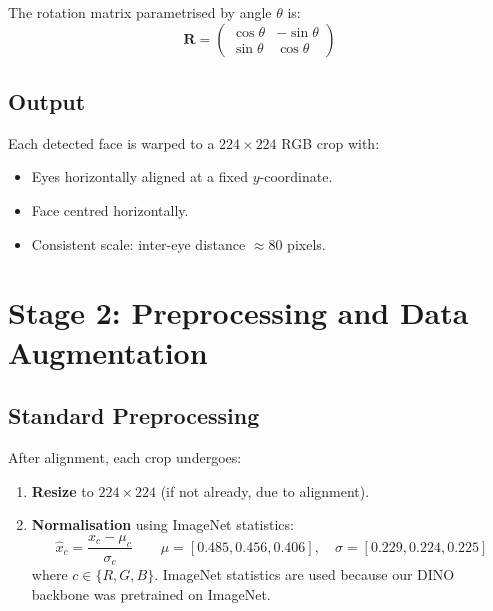 \documentclass[12pt,a4paper]{article}
\begin{document}
The rotation matrix parametrised by angle $\theta$ is:
\begin{equation}
  \mathbf{R} = \begin{pmatrix} \cos\theta & -\sin\theta \\ \sin\theta & \cos\theta \end{pmatrix}
\end{equation}

\subsection{Output}

Each detected face is warped to a $224 \times 224$ RGB crop with:
\begin{itemize}[leftmargin=1.5em]
  \item Eyes horizontally aligned at a fixed $y$-coordinate.
  \item Face centred horizontally.
  \item Consistent scale: inter-eye distance $\approx 80$ pixels.
\end{itemize}

\newpage

\section{Stage 2: Preprocessing and Data Augmentation}

\subsection{Standard Preprocessing}

After alignment, each crop undergoes:

\begin{enumerate}[leftmargin=1.5em]
  \item \textbf{Resize} to $224 \times 224$ (if not already, due to alignment).
  \item \textbf{Normalisation} using ImageNet statistics:
    \begin{equation}
      \hat{x}_c = \frac{x_c - \mu_c}{\sigma_c}
      \qquad \mu = [0.485, 0.456, 0.406],\quad \sigma = [0.229, 0.224, 0.225]
    \end{equation}
    where $c \in \{R, G, B\}$. ImageNet statistics are used because our DINO backbone
    was pretrained on ImageNet.
\end{enumerate}
\end{document}
